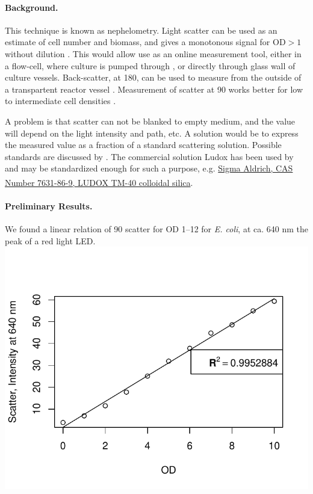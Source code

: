 \documentclass[12pt,a4paper]{scrartcl}
\begin{document}
\paragraph{Background.}
This technique is known as nephelometry.  Light scatter can be used as
an estimate of cell number and biomass, and gives a monotonous signal
for OD$>1$ without dilution \citep{Hancher1974}. This would allow use
as an online measurement tool, either in a flow-cell, where culture is
pumped through \citep{Hancher1974}, or directly through glass wall of
culture vessels. Back-scatter, at 180\textdegree{}, can be used to
measure from the outside of a transpartent reactor vessel
\citep{Ude2014, Bruder2016}. Measurement of scatter at 90\textdegree{}
works better for low to intermediate cell densities \citep{Ude2014}.

A problem is that scatter can not be blanked to empty medium, and the
value will depend on the light intensity and path, etc. A solution
would be to express the measured value as a fraction of a standard
scattering solution. Possible standards are discussed by
\cite{Buffone1976}. The commercial solution Ludox has been used by
\cite{Maron1954} and may be standardized enough for such a purpose,
e.g. \href{http://www.sigmaaldrich.com/catalog/product/aldrich/420786}{Sigma Aldrich, CAS Number 7631-86-9, LUDOX\textsuperscript{\textregistered} TM-40 colloidal silica}.

\paragraph{Preliminary Results.}
We found a linear relation of 90\textdegree{} scatter for OD 1--12 for
\textit{E. coli}, at ca. 640 nm the peak of a red light LED.\\
\includegraphics[width=.4\textwidth]{../data/scatter_test1.pdf}
\end{document}
